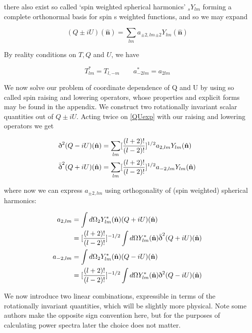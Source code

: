 \documentclass[a4paper,10pt]{article}
\renewcommand{\v}[1]{\mathbf{#1}}
\newcommand{\unit}[1]{\hat{\v{#1}}}
\newcommand{\sr}{\text{\normalfont\dh}}
\renewcommand{\sl}{\bar{\text{\normalfont\dh}}}
\newcommand{\ltwo}{[\frac{(l+2)!}{(l-2)!}]}
\begin{document}
there also exist so called `spin weighted spherical harmonics' $_sY_{lm}$ forming a complete orthonormal basis for spin s weighted functions, and so we may expand

\begin{equation}
(Q\pm iU)(\unit{n}) = \sum_{lm} a_{\pm2,lm} {}_{\pm2}Y_{lm}(\unit{n})
\label{QUexp}
\end{equation}

By reality conditions on $T, Q$ and $U$, we have

\begin{equation}
T_{lm}^* = T_{l,-m} \qquad a_{-2lm}^*=a_{2lm}
\end{equation}

We now solve our problem of coordinate dependence of Q and U by using so called spin raising and lowering operators, whose properties and explicit forms may be found in the appendix. We construct two rotationally invariant scalar quantities out of $Q\pm iU$. Acting twice on \ref{QUexp} with our raising and lowering operators we get

\begin{equation}\begin{split}
\sr^2(Q-iU)(\unit{n}) &= \sum_{lm} \ltwo^{1/2} a_{2,lm} {}Y_{lm}(\unit{n})\\
\sl^2(Q+iU)(\unit{n}) &= \sum_{lm} \ltwo^{1/2} a_{-2,lm} {}Y_{lm}(\unit{n})
\end{split}\end{equation}

where now we can express $a_{\pm2,lm}$ using orthogonality of (spin weighted) spherical harmonics:


\begin{equation}\begin{split}
a_{2,lm} &= \int d\Omega {}_2Y_{lm}^*(\unit{n})(Q+iU)(\unit{n})\\
&= \ltwo^{-1/2}\int d\Omega Y_{lm}^*(\unit{n})\sl^2(Q+iU)(\unit{n})\\
a_{-2,lm} &= \int d\Omega {}_2Y_{lm}^*(\unit{n})(Q-iU)(\unit{n})\\
&= \ltwo^{-1/2}\int d\Omega Y_{lm}^*(\unit{n})\sr^2(Q-iU)(\unit{n})
\end{split}\end{equation}

We now introduce two linear combinations, expressible in terms of the rotationally invariant quantities, which will be slightly more physical. Note some authors make the opposite sign convention here, but for the purposes of calculating power spectra later the choice does not matter.
\end{document}
